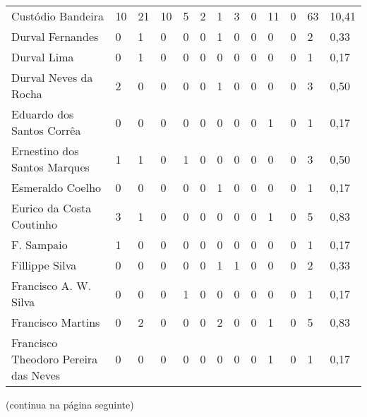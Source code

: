 \begin{table}[!htp]
{\begin{tabular}{lllllllllllll}
Custódio Bandeira	&10	&21	&10	&5	&2	&1	&3	&0	&11	&0	&63	&10,41\\
Durval Fernandes	&0	&1	&0	&0	&0	&1	&0	&0	&0	&0	&2	&0,33\\
Durval Lima	&0	&1	&0	&0	&0	&0	&0	&0	&0	&0	&1	&0,17\\
Durval Neves da Rocha	&2	&0	&0	&0	&0	&1	&0	&0	&0	&0	&3	&0,50\\
Eduardo dos Santos Corrêa	&0	&0	&0	&0	&0	&0	&0	&0	&1	&0	&1	&0,17\\
Ernestino dos Santos Marques	&1	&1	&0	&1	&0	&0	&0	&0	&0	&0	&3	&0,50\\
Esmeraldo Coelho	&0	&0	&0	&0	&0	&1	&0	&0	&0	&0	&1	&0,17\\
Eurico da Costa Coutinho	&3	&1	&0	&0	&0	&0	&0	&0	&1	&0	&5	&0,83\\
F. Sampaio	&1	&0	&0	&0	&0	&0	&0	&0	&0	&0	&1	&0,17\\
Fillippe Silva	&0	&0	&0	&0	&0	&1	&1	&0	&0	&0	&2	&0,33\\
Francisco A. W. Silva	&0	&0	&0	&1	&0	&0	&0	&0	&0	&0	&1	&0,17\\
Francisco Martins	&0	&2	&0	&0	&0	&2	&0	&0	&1	&0	&5	&0,83\\
Francisco Theodoro Pereira das Neves	&0	&0	&0	&0	&0	&0	&0	&0	&1	&0	&1	&0,17\\
\bottomrule
\end{tabular} 
}
{}
\end{table}
(continua na página seguinte)

